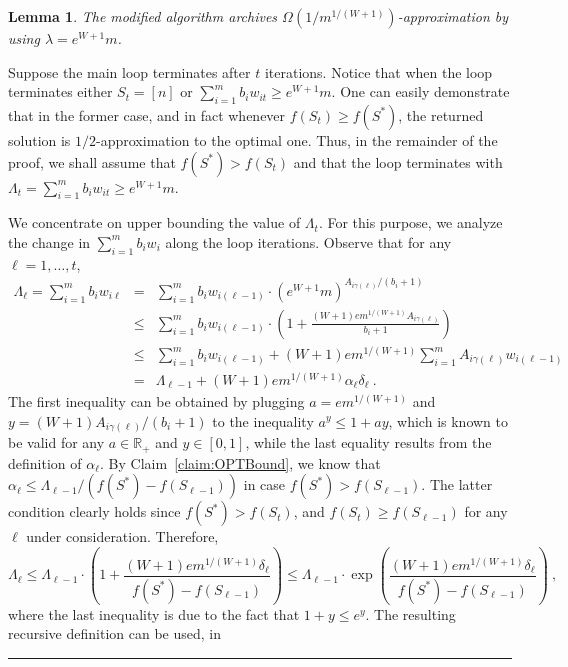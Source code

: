 \documentclass[11pt]{article}
\theoremstyle{plain}
\newtheorem{lemma}[theorem]{Lemma}
\theoremstyle{definition}
\newcommand{\qedsymb}{\hfill{\rule{2mm}{2mm}}}
\renewenvironment{proof}{\begin{trivlist} \item[\hspace{\labelsep}{\bf \noindent Proof.\/}] }{\qedsymb\end{trivlist}}\newenvironment{proofof}[1]{\begin{trivlist} \item[\hspace{\labelsep}{\bf \noindent Proof of #1.\/}] }{\qedsymb\end{trivlist}}\newenvironment{MyEqn}[1]{\setlength\arraycolsep{2pt}\begin{eqnarray*} #1}{\end{eqnarray*}}
\newcommand{\bbR}{\mathbb{R}}
\begin{document}
\begin{lemma} \label{lemma:0-1-Approx}
The modified algorithm archives $\Omega(1 /
m^{1/(W+1)})$-approximation by using $\lambda = e^{W+1} m$.
\end{lemma}
\begin{proof}
Suppose the main loop terminates after $t$ iterations. Notice that
when the loop terminates either $S_t = [n]$ or $\sum_{i=1}^m b_i
w_{it} \geq e^{W+1} m$. One can easily demonstrate that in the
former case, and in fact whenever $f(S_t) \geq f(S^*)$, the
returned solution is $1/2$-approximation to the optimal one. Thus,
in the remainder of the proof, we shall assume that $f(S^*)
> f(S_t)$ and that the loop terminates with $\Lambda_t =
\sum_{i=1}^m b_i w_{it} \geq e^{W+1} m$.

We concentrate on upper bounding the value of $\Lambda_t$. For
this purpose, we analyze the change in $\sum_{i=1}^m b_i w_i$
along the loop iterations. Observe that for any $\ell = 1, \ldots,
t$,
\begin{eqnarray*}
\Lambda_{\ell} = \sum_{i=1}^m b_i w_{i\ell} & = & \sum_{i=1}^m b_i w_{i(\ell-1)} \cdot \left(e^{W+1} m\right)^{A_{i\gamma(\ell)}/(b_i + 1)}\\
& \leq & \sum_{i=1}^m b_i w_{i(\ell-1)} \cdot \left(1 + \frac{(W+1) e m^{1/(W+1)} A_{i\gamma(\ell)}}{b_i + 1}\right)\\
& \leq & \sum_{i=1}^m b_i w_{i(\ell-1)} + (W+1) e m^{1/(W+1)} \sum_{i=1}^m A_{i\gamma(\ell)} w_{i(\ell-1)}\\
& = & \Lambda_{\ell - 1} + (W+1) e m^{1/(W+1)} \alpha_\ell
\delta_\ell \ .
\end{eqnarray*}
The first inequality can be obtained by plugging $a = e
m^{1/(W+1)}$ and $y = (W+1) A_{i\gamma(\ell)}/ (b_i + 1)$ to the
inequality $a^y \leq 1 + ay$, which is known to be valid for any
$a \in \bbR_+$ and $y \in [0,1]$, while the last equality results
from the definition of $\alpha_\ell$. By
Claim~\ref{claim:OPTBound}, we know that $\alpha_\ell \leq
\Lambda_{\ell-1} / (f(S^*) - f(S_{\ell-1}))$ in case $f(S^*) >
f(S_{\ell-1})$. The latter condition clearly holds since $f(S^*) >
f(S_t)$, and $f(S_t) \geq f(S_{\ell-1})$ for any $\ell$ under
consideration. Therefore,
$$
\Lambda_\ell \leq \Lambda_{\ell-1} \cdot \left(1 + \frac{(W+1) e
m^{1/(W+1)} \delta_\ell}{f(S^*) - f(S_{\ell-1})}\right) \leq
\Lambda_{\ell-1} \cdot \exp\left(\frac{(W+1) e m^{1/(W+1)}
\delta_\ell}{f(S^*) - f(S_{\ell-1})}\right) \ ,
$$
where the last inequality is due to the fact that $1 + y \leq
e^y$. The resulting recursive definition can be used, in

\end{proof}
\end{document}
